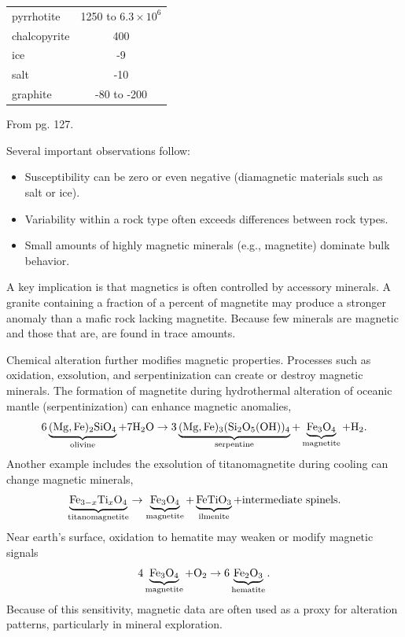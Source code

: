 \begin{table}
\begin{threeparttable}
\begin{tabular}{lc}
        pyrrhotite        & 1250 to $6.3 \times 10^{6}$ \\
        chalcopyrite      & 400 \\
        ice               & -9 \\
        salt              & -10 \\
        graphite          & -80 to -200 \\
        \bottomrule
    \end{tabular}
    \begin{tablenotes}
        \item From \citet{Reynolds1997} pg. 127.
    \end{tablenotes}
    \end{threeparttable}
\end{table}
Several important observations follow:
\begin{itemize}
    \item Susceptibility can be zero or even negative (diamagnetic materials such as salt or ice).
    \item Variability within a rock type often exceeds differences between rock types.
    \item Small amounts of highly magnetic minerals (e.g., magnetite) dominate bulk behavior.
\end{itemize}

A key implication is that magnetics is often controlled by accessory minerals. A granite containing a fraction of a percent of magnetite may produce a stronger anomaly than a mafic rock lacking magnetite.  Because few minerals are magnetic and those that are, are found in trace amounts.  

Chemical alteration further modifies magnetic properties. Processes such as oxidation, exsolution, and serpentinization can create or destroy magnetic minerals. The formation of magnetite during hydrothermal alteration of oceanic mantle (serpentinization) can enhance magnetic anomalies, 
\[
    6\underbrace{\ce{(Mg,Fe)2SiO4}}_{\text{olivine}} + 7\ce{H2O} \rightarrow
    3\underbrace{\ce{(Mg,Fe)3(Si_2O_5(OH))4}}_{\text{serpentine}} +
    \underbrace{\ce{Fe3O4}}_{\text{magnetite}} + \ce{H2} .
\]
Another example includes the exsolution of titanomagnetite during cooling can change magnetic minerals,
\[
    \underbrace{\ce{Fe_{3-x}Ti_xO4}}_{\text{titanomagnetite}} \rightarrow
    \underbrace{\ce{Fe3O4}}_{\text{magnetite}} +
    \underbrace{\ce{FeTiO3}}_{\text{ilmenite}} + \text{intermediate~spinels} .
\]
Near earth's surface, oxidation to hematite may weaken or modify magnetic signals
\[
    4\underbrace{\ce{Fe3O4}}_{\text{magnetite}} + \ce{O2} \rightarrow
    6\underbrace{\ce{Fe2O3}}_{\text{hematite}} .
\]
Because of this sensitivity, magnetic data are often used as a proxy for alteration patterns, particularly in mineral exploration.

